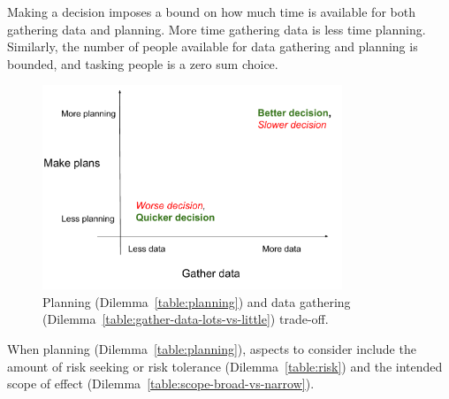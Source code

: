 


Making a decision imposes a bound on how much time is available for both gathering data and planning. More time gathering data is less time planning. Similarly, the number of people available for data gathering and planning is bounded, and tasking people is a zero sum choice.

\begin{figure}[H] %
    \centering
    \includegraphics[width=0.8\textwidth]{images/planning_and_data_gathering.pdf}
    \caption{Planning (Dilemma~\ref{table:planning}) and data gathering (Dilemma~\ref{table:gather-data-lots-vs-little}) trade-off.}
    \label{fig:pareto_frontier}
\end{figure}




When planning (Dilemma~\ref{table:planning}), aspects to consider include
the amount of risk seeking or risk tolerance (Dilemma~\ref{table:risk})
and
the intended scope of effect  (Dilemma~\ref{table:scope-broad-vs-narrow}).

